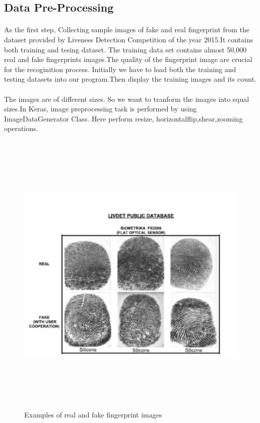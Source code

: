 \documentclass[a4paper,12pt,oneside]{article}
\begin{document}
\subsection{Data Pre-Processing}
\paragraph{}
As the first step, Collecting sample images of fake and real fingerprint from the dataset provided by Liveness Detection Competition of the year 2015.It contains both training and tesing dataset. The training data set contains almost 50,000 real and fake fingerprints images.The quality of the fingerprint image are crucial for the recoginition process.
Initially we have to load both the training and testing datasets into our program.Then display the training images and its count.
\paragraph{}
The images are of different sizes. So we want to tranform the images into equal sizes.In Keras, image preprocessing task is performed by using ImageDataGenerator Class. Here perform resize, 
horizontalflip,shear,zooming operations.





\begin{figure}[H]
\centering
\includegraphics[height=14cm,width=15cm]{dataset.PNG}
\caption{Examples of real and fake fingerprint images} 
\end{figure}
\end{document}
